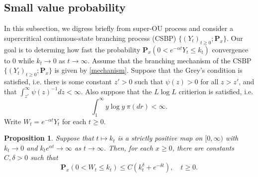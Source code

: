 \documentclass[12pt,a4paper]{amsart}
\theoremstyle{plain}
\newtheorem{prop}[thm]{Proposition}
\theoremstyle{definition}
\numberwithin{equation}{section}
\begin{document}
\subsection{Small value probability}
    In this subsection, we digress briefly from super-OU process and consider a supercritical continuous-state branching process (CSBP)
    $\{(Y_t)_{t\geq 0}; \mathbf P_x\}$.
    Our goal is to determing how fast the probability $\mathbf P_x(0<e^{-\alpha t}Y_t \leq k_t)$ convergence to $0$ while $k_t \to 0$ as $t\to \infty$.
  Assume that the branching mechanism of the CSBP $\{(Y_t)_{t\geq 0}; \mathbf P_x\}$ is given by \eqref{mechanism}.
    Suppose that the Grey's condition is satisfied, i.e. there is some constant $z' > 0$ such that $\psi(z) > 0$ for all $z>z'$, and that $\int_{z'}^\infty \psi(z)^{-1}dz < \infty$.
    Also suppose that the $L \log L$ critierion is satisfied, i.e.
\[
    \int_1^\infty y \log y~\pi(dr)< \infty.
\]
    Write $W_t = e^{-\alpha t}Y_t$ for each $t\geq 0$.
\begin{prop}
\label{lem: control of XT}
    Suppose that $t\mapsto k_t$ is a strictly positive map on $[0,\infty)$ with $k_t \to 0$ and $k_t e^{\alpha t} \to \infty$ as $t\to \infty$.
    Then, for each $x\geq 0$, there are constants $C,\delta>0$ such that
\[
    \mathbf P_x(0<W_t\leq k_t) \leq C(k_t^\delta + e^{-\delta t}), \quad t\geq 0.
\]
\end{prop}
\end{document}

